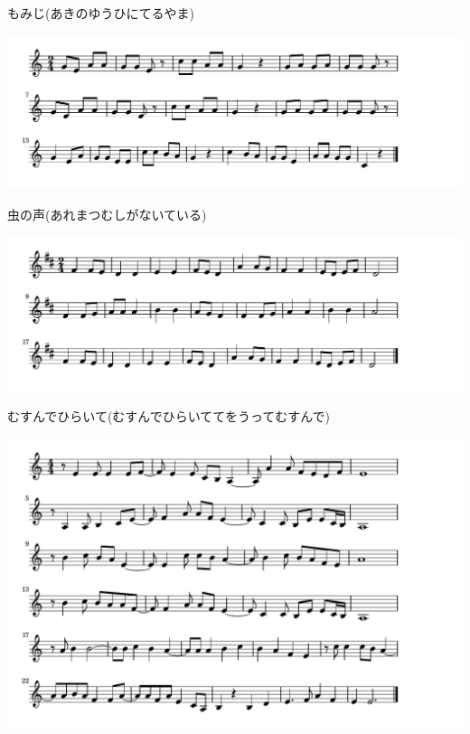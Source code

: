 \documentclass[a4paper]{ltjsarticle}
\begin{document}
\vspace{-10mm} \hspace{10mm}
もみじ(あきのゆうひにてるやま)



\includegraphics[clip]{mushinokoe_crop.pdf}

\vspace{-10mm} \hspace{10mm}
虫の声(あれまつむしがないている)



\includegraphics[clip]{musunde_crop.pdf}

\vspace{-10mm} \hspace{10mm}
むすんでひらいて(むすんでひらいててをうってむすんで)



\includegraphics[clip]{nangoku_crop.pdf}
\end{document}
